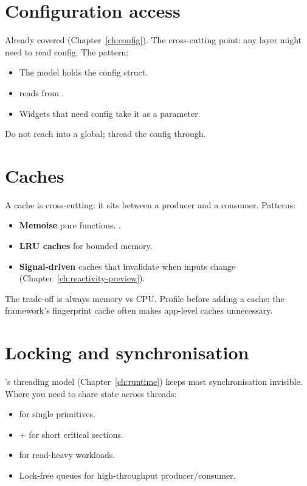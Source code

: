 \section{Configuration access}

Already covered (Chapter~\ref{ch:config}). The cross-cutting
point: any layer might need to read config. The pattern:

\begin{itemize}[leftmargin=*]
  \item The model holds the config struct.
  \item {} reads from .
  \item Widgets that need config take it as a parameter.
\end{itemize}

Do not reach into a global; thread the config through.

\section{Caches}

A cache is cross-cutting: it sits between a producer and a
consumer. Patterns:

\begin{itemize}[leftmargin=*]
  \item \textbf{Memoise} pure functions.
    .
  \item \textbf{LRU caches} for bounded memory.
  \item \textbf{Signal-driven} caches that invalidate when
    inputs change (Chapter~\ref{ch:reactivity-preview}).
\end{itemize}

The trade-off is always memory vs CPU. Profile before adding a
cache; the framework's fingerprint cache often makes app-level
caches unnecessary.

\section{Locking and synchronisation}

\maya{}'s threading model (Chapter~\ref{ch:runtime}) keeps most
synchronisation invisible. Where you need to share state across
threads:

\begin{itemize}[leftmargin=*]
  \item {} for single primitives.
  \item {} +  for short
    critical sections.
  \item {} for read-heavy workloads.
  \item Lock-free queues for high-throughput producer/consumer.
\end{itemize}

